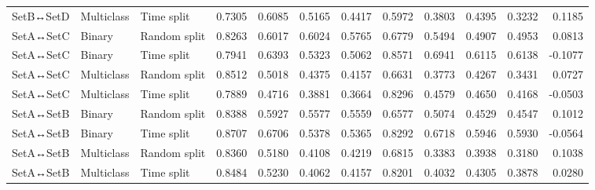 \begin{table}
\begin{tabular}{lllrrrrrrrrr}
SetB↔SetD & Multiclass & Time split & 0.7305 & 0.6085 & 0.5165 & 0.4417 & 0.5972 & 0.3803 & 0.4395 & 0.3232 & 0.1185 \\
SetA↔SetC & Binary & Random split & 0.8263 & 0.6017 & 0.6024 & 0.5765 & 0.6779 & 0.5494 & 0.4907 & 0.4953 & 0.0813 \\
SetA↔SetC & Binary & Time split & 0.7941 & 0.6393 & 0.5323 & 0.5062 & 0.8571 & 0.6941 & 0.6115 & 0.6138 & -0.1077 \\
SetA↔SetC & Multiclass & Random split & 0.8512 & 0.5018 & 0.4375 & 0.4157 & 0.6631 & 0.3773 & 0.4267 & 0.3431 & 0.0727 \\
SetA↔SetC & Multiclass & Time split & 0.7889 & 0.4716 & 0.3881 & 0.3664 & 0.8296 & 0.4579 & 0.4650 & 0.4168 & -0.0503 \\
SetA↔SetB & Binary & Random split & 0.8388 & 0.5927 & 0.5577 & 0.5559 & 0.6577 & 0.5074 & 0.4529 & 0.4547 & 0.1012 \\
SetA↔SetB & Binary & Time split & 0.8707 & 0.6706 & 0.5378 & 0.5365 & 0.8292 & 0.6718 & 0.5946 & 0.5930 & -0.0564 \\
SetA↔SetB & Multiclass & Random split & 0.8360 & 0.5180 & 0.4108 & 0.4219 & 0.6815 & 0.3383 & 0.3938 & 0.3180 & 0.1038 \\
SetA↔SetB & Multiclass & Time split & 0.8484 & 0.5230 & 0.4062 & 0.4157 & 0.8201 & 0.4032 & 0.4305 & 0.3878 & 0.0280 \\
\bottomrule
\end{tabular}
\end{table}
